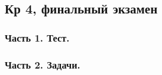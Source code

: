 \documentclass[12pt, a4paper]{article}
\begin{document}
\subsection{Кр 4, финальный экзамен}

\subsubsection*{Часть 1. Тест.}





\subsubsection*{Часть 2. Задачи.}
\end{document}
